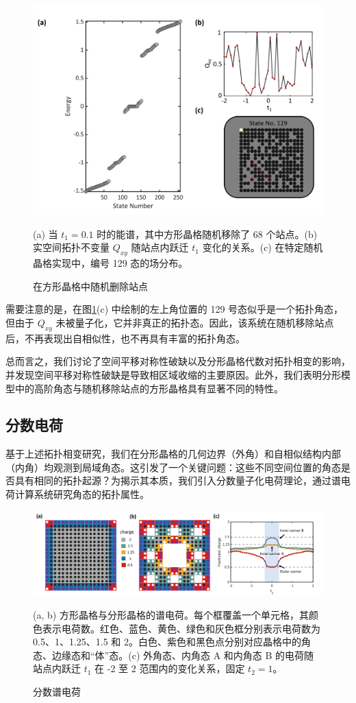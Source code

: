 \begin{figure}[htbp]
    \centering
    \includegraphics[width=0.5\linewidth]{figure/HOTITheo/RandDel.png}
    \caption{在方形晶格中随机删除站点}(a) 当 \( t_1=0.1 \) 时的能谱，其中方形晶格随机移除了 68 个站点。(b) 实空间拓扑不变量 \( Q_{xy} \) 随站点内跃迁 \( t_1 \) 变化的关系。(c) 在特定随机晶格实现中，编号 129 态的场分布。
    \label{fig:RandDel}
\end{figure}

需要注意的是，在图\ref{fig:RandDel}(c) 中绘制的左上角位置的 129 号态似乎是一个拓扑角态，但由于 \( Q_{xy} \) 未被量子化，它并非真正的拓扑态。因此，该系统在随机移除站点后，不再表现出自相似性，也不再具有丰富的拓扑角态。

总而言之，我们讨论了空间平移对称性破缺以及分形晶格代数对拓扑相变的影响，并发现空间平移对称性破缺是导致相区域收缩的主要原因。此外，我们表明分形模型中的高阶角态与随机移除站点的方形晶格具有显著不同的特性。

\subsection{分数电荷}
基于上述拓扑相变研究，我们在分形晶格的几何边界（外角）和自相似结构内部（内角）均观测到局域角态。这引发了一个关键问题：这些不同空间位置的角态是否具有相同的拓扑起源？为揭示其本质，我们引入分数量子化电荷理论\cite{li2020fractional,peterson2021trapped,liu2021bulk}，通过谱电荷计算系统研究角态的拓扑属性。

\begin{figure}[htbp]
    \centering
    \includegraphics[width=1\linewidth]{figure/HOTITheo/Fractional.png}
    \caption{分数谱电荷}(a, b) 方形晶格与分形晶格的谱电荷。每个框覆盖一个单元格，其颜色表示电荷数。红色、蓝色、黄色、绿色和灰色框分别表示电荷数为 0.5、1、1.25、1.5 和 2。白色、紫色和黑色点分别对应晶格中的角态、边缘态和“体”态。(c) 外角态、内角态 A 和内角态 B 的电荷随站点内跃迁 \( t_1 \) 在 -2 至 2 范围内的变化关系，固定 \( t_2 = 1 \)。
    \label{fig:Fractional}
\end{figure}

